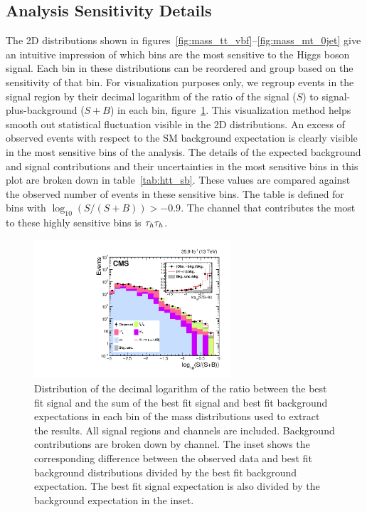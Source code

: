 \subsection{Analysis Sensitivity Details}
The 2D distributions shown in figures~\ref{fig:mass_tt_vbf}--\ref{fig:mass_mt_0jet} give an intuitive
impression of which bins are the most sensitive to the Higgs boson signal. Each bin in these distributions
can be reordered and group based on the sensitivity of that bin. For visualization purposes only, we regroup 
events in the signal region by their decimal logarithm of the ratio of the signal ($S$) to 
signal-plus-background ($S+B$) in each bin, figure~\ref{fig:htt_sb}. This visualization method helps smooth out statistical
fluctuation visible in the 2D distributions. An excess of observed events with respect to the 
SM background expectation is clearly visible in the most sensitive bins of the analysis.
The details of the expected background and signal contributions and their uncertainties in the most sensitive bins in 
this plot are broken down in table~\ref{tab:htt_sb}. 
These values are compared against the observed number of events in these sensitive bins. 
The table is defined for bins with $\log_{10}(S/(S+B))>-0.9$. The channel that contributes the 
most to these highly sensitive bins is $\tau_{h}\tau_{h}$.

\begin{figure}[htb]
  \centering
    \includegraphics[width=0.65\textwidth]{higgs_to_taus/plots/Figure_018.pdf}
   \caption{Distribution of the decimal logarithm of the ratio between the best fit signal and the sum of 
the best fit signal and best fit background expectations in each bin of the mass distributions used to extract the results.
All signal regions and channels are included. Background contributions are broken down by channel. 
The inset shows the corresponding difference between the observed data and best fit background 
distributions divided by the best fit background expectation. The best fit signal expectation 
is also divided by the background expectation in the inset.
   }
\label{fig:htt_sb}

\end{figure}

